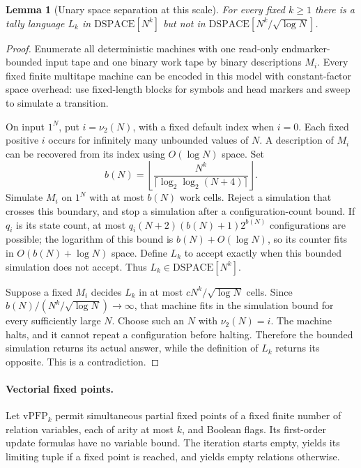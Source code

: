 \documentclass[11pt]{article}
\newtheorem{lemma}[theorem]{Lemma}
\theoremstyle{definition}
\theoremstyle{remark}
\begin{document}
\begin{lemma}[Unary space separation at this scale]
\label{lem:tally-separation}
For every fixed $k\geq1$ there is a tally language $L_k$ in
$\mathrm{DSPACE}[N^k]$ but not in
$\mathrm{DSPACE}[N^k/\sqrt{\log N}]$.
\end{lemma}
\begin{proof}
Enumerate all deterministic machines with one read-only endmarker-bounded
input tape and one binary work tape by binary descriptions $M_i$.
Every fixed finite multitape machine can be encoded in this model with
constant-factor space overhead: use fixed-length blocks for symbols
and head markers and sweep to simulate a transition.

On input $1^N$, put $i=\nu_2(N)$, with a fixed default index when $i=0$.
Each fixed positive $i$ occurs for infinitely many unbounded values of
$N$. A description of $M_i$ can be recovered from its index using
$O(\log N)$ space. Set
\[
 b(N)=\left\lfloor
 \frac{N^k}{\lceil\log_2\log_2(N+4)\rceil}
 \right\rfloor.
\]
Simulate $M_i$ on $1^N$ with at most $b(N)$ work cells. Reject a
simulation that crosses this boundary, and stop a simulation after a
configuration-count bound. If $q_i$ is its state count, at most
$q_i(N+2)(b(N)+1)2^{b(N)}$ configurations are possible; the logarithm
of this bound is $b(N)+O(\log N)$, so its counter fits in $O(b(N)+\log N)$
space. Define $L_k$ to accept exactly when this bounded simulation does
not accept. Thus $L_k\in\mathrm{DSPACE}[N^k]$.

Suppose a fixed $M_i$ decides $L_k$ in at most
$cN^k/\sqrt{\log N}$ cells. Since
$b(N)/(N^k/\sqrt{\log N})\to\infty$, that machine fits in the
simulation bound for every sufficiently large $N$. Choose such an $N$
with $\nu_2(N)=i$. The machine halts, and it cannot repeat a
configuration before halting. Therefore the bounded simulation returns
its actual answer, while the definition of $L_k$ returns its opposite.
This is a contradiction.
\end{proof}

\paragraph{Vectorial fixed points.}
Let $\mathrm{vPFP}_k$ permit simultaneous partial fixed points of a
fixed finite number of relation variables, each of arity at most $k$,
and Boolean flags. Its first-order update formulas have no variable
bound. The iteration starts empty, yields its limiting tuple if a
fixed point is reached, and yields empty relations otherwise.
\end{document}
